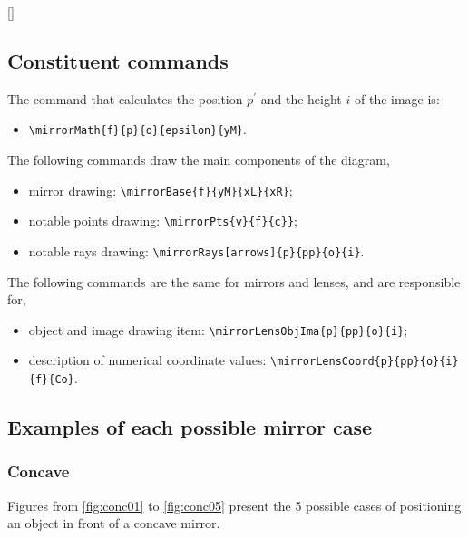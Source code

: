 \documentclass[a4paper,10pt]{article}
\begin{document}
\begin{table}[!ht]
  \centering
  [\linewidth]{
    
  }
\end{table}

\subsection{Constituent commands}

The command that calculates the position $p^{\prime}$ and the height $i$ of the image is:
\begin{itemize}
  \item \verb|\mirrorMath{f}{p}{o}{epsilon}{yM}|.
\end{itemize}

The following commands draw the main components of the diagram,
\begin{itemize}
   \item mirror drawing: \verb|\mirrorBase{f}{yM}{xL}{xR}|;
   \item notable points drawing: \verb|\mirrorPts{v}{f}{c}}|;
   \item notable rays drawing: \verb|\mirrorRays[arrows]{p}{pp}{o}{i}|.
\end{itemize}

The following commands are the same for mirrors and lenses, and are responsible for,
\begin{itemize}
   \item object and image drawing item: \verb|\mirrorLensObjIma{p}{pp}{o}{i}|;
   \item description of numerical coordinate values: \verb|\mirrorLensCoord{p}{pp}{o}{i}{f}{Co}|.
\end{itemize}

\subsection{Examples of each possible mirror case}

\subsubsection{Concave}

Figures from \ref{fig:conc01} to \ref{fig:conc05} present the 5 possible cases of positioning an object in front of a concave mirror.

\end{document}
